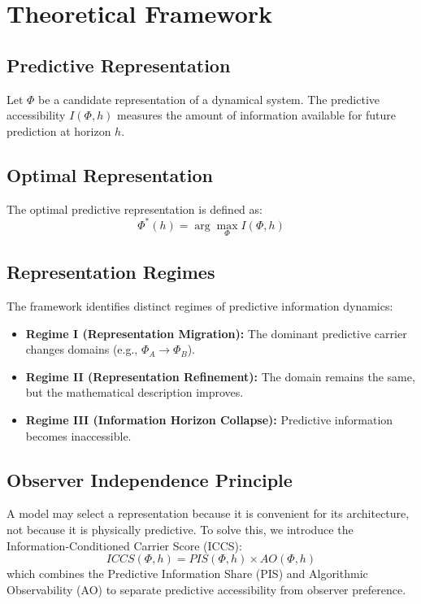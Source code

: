 \section{Theoretical Framework}

\subsection{Predictive Representation}
Let $\Phi$ be a candidate representation of a dynamical system. The predictive accessibility $I(\Phi,h)$ measures the amount of information available for future prediction at horizon $h$.

\subsection{Optimal Representation}
The optimal predictive representation is defined as:
\begin{equation}
\Phi^*(h) = \arg\max_\Phi I(\Phi,h)
\end{equation}

\subsection{Representation Regimes}
The framework identifies distinct regimes of predictive information dynamics:
\begin{itemize}
    \item \textbf{Regime I (Representation Migration):} The dominant predictive carrier changes domains (e.g., $\Phi_A \to \Phi_B$).
    \item \textbf{Regime II (Representation Refinement):} The domain remains the same, but the mathematical description improves.
    \item \textbf{Regime III (Information Horizon Collapse):} Predictive information becomes inaccessible.
\end{itemize}

\subsection{Observer Independence Principle}
A model may select a representation because it is convenient for its architecture, not because it is physically predictive. To solve this, we introduce the Information-Conditioned Carrier Score (ICCS):
\begin{equation}
ICCS(\Phi,h) = PIS(\Phi,h) \times AO(\Phi,h)
\end{equation}
which combines the Predictive Information Share (PIS) and Algorithmic Observability (AO) to separate predictive accessibility from observer preference.

